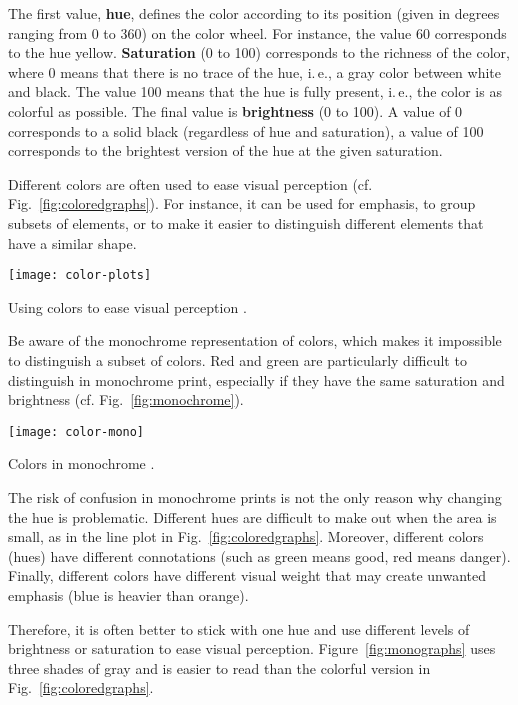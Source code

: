 The first value, \textbf{hue}, defines the color according to its position (given in degrees ranging from 0 to 360) on the color wheel. For instance, the value 60 corresponds to the hue yellow. \textbf{Saturation} (0 to 100) corresponds to the richness of the color, where 0 means that there is no trace of the hue, i.\,e., a gray color between white and black. The value 100 means that the hue is fully present, i.\,e., the color is as colorful as possible. The final value is \textbf{brightness} (0 to 100). A value of 0 corresponds to a solid black (regardless of hue and saturation), a value of 100 corresponds to the brightest version of the hue at the given saturation.

Different colors are often used to ease visual perception (cf. Fig.~\ref{fig:coloredgraphs}). For instance, it can be used for emphasis, to group subsets of elements, or to make it easier to distinguish different elements that have a similar shape.

\begin{marginfigure}
\centering
\texttt{[image: color-plots]}
\caption{\label{fig:coloredgraphs} Using colors to ease visual perception \cite{Carter12}.}%
\end{marginfigure}


Be aware of the monochrome representation of colors, which makes it impossible to distinguish a subset of colors. Red and green are particularly difficult to distinguish in monochrome print, especially if they have the same saturation and brightness (cf. Fig.~\ref{fig:monochrome}).

\begin{marginfigure}
\centering
\texttt{[image: color-mono]}
\caption{\label{fig:monochrome} Colors in monochrome \cite{Carter12}.}%
\end{marginfigure}

The risk of confusion in monochrome prints is not the only reason why changing the hue is problematic. Different hues are difficult to make out when the area is small, as in the line plot in  Fig.~\ref{fig:coloredgraphs}. Moreover, different colors (hues) have different connotations (such as green means good, red means danger). Finally, different colors have different visual weight that may create unwanted emphasis (blue is heavier than orange).

Therefore, it is often better to stick with one hue and use different levels of brightness or saturation to ease visual perception. Figure~\ref{fig:monographs} uses three shades of gray and is easier to read than the colorful version in Fig.~\ref{fig:coloredgraphs}.


